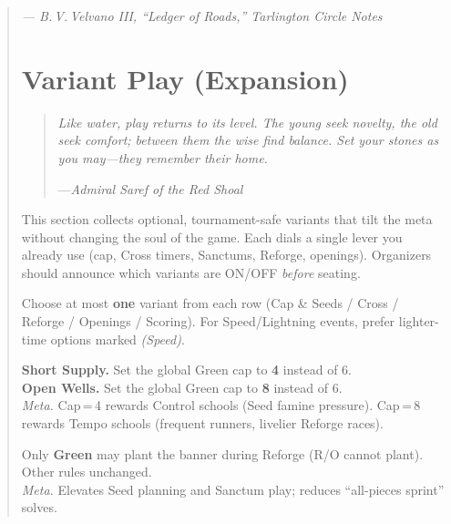 \documentclass[11pt]{article}
\begin{document}
\begin{quote}
\begin{tcolorbox}[enhanced,breakable,
  colback=royal!3, colframe=royal!70!black, boxrule=0.6pt,
  title={Fenwood’s Memorandum on the Canray Theory}]
\begin{enumerate}[leftmargin=*,itemsep=0.5em,label=\textbf{Thesis \Roman*.}]
\end{enumerate}

\raggedleft\emph{— B.\,V.\,Velvano III, “Ledger of Roads,” Tarlington Circle Notes}\par
\end{tcolorbox}



\section{Variant Play (Expansion)}
\label{sec:variant-play}

\begin{quote}\small\itshape
Like water, play returns to its level. The young seek novelty, the old seek comfort; between them the wise find balance. Set your stones as you may—they remember their home.
\par\hfill—\textit{Admiral Saref of the Red Shoal}
\end{quote}

\noindent
This section collects optional, tournament-safe variants that tilt the meta without changing the soul of the game. Each dials a single lever you already use (cap, Cross timers, Sanctums, Reforge, openings). Organizers should announce which variants are ON/OFF \emph{before} seating.

\medskip
\begin{tcolorbox}[enhanced,colback=royal!3,colframe=royal!70!black,boxrule=0.6pt,title={How to Use These}]
\small
Choose at most \textbf{one} variant from each row (Cap \& Seeds / Cross / Reforge / Openings / Scoring). For Speed/Lightning events, prefer lighter-time options marked \emph{(Speed)}.
\end{tcolorbox}

\begin{rulevariant}[title={Short Supply / Open Wells (Green Cap Dials)}]
\textbf{Short Supply.} Set the global Green cap to \textbf{4} instead of 6.\\
\textbf{Open Wells.} Set the global Green cap to \textbf{8} instead of 6.\\[0.3em]
\textit{Meta.} Cap\,=\,4 rewards Control schools (Seed famine pressure). Cap\,=\,8 rewards Tempo schools (frequent runners, livelier Reforge races).
\end{rulevariant}

\begin{rulevariant}[title={Greens-Only Plant (Runner Restriction)}]
Only \textbf{Green} may plant the banner during Reforge (R/O cannot plant). Other rules unchanged.\\
\textit{Meta.} Elevates Seed planning and Sanctum play; reduces “all-pieces sprint” solves.
\end{rulevariant}


\end{quote}
\end{document}

